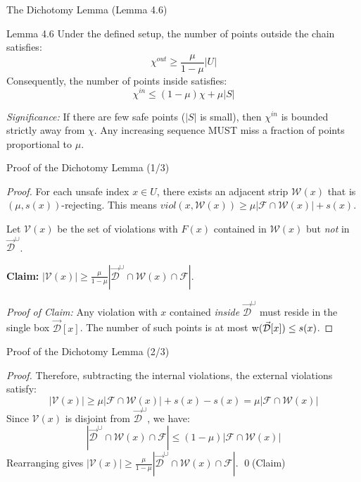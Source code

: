 \documentclass[11pt,aspectratio=169]{beamer}
\newcommand{\width}{{\bf {\rm  w}}}
\begin{document}
\begin{frame}{The Dichotomy Lemma (Lemma 4.6)}
    \begin{block}{Lemma 4.6}
        Under the defined setup, the number of points outside the chain satisfies:
        $$\chi^{out} \geq \frac{\mu}{1-\mu} |U|$$
        Consequently, the number of points inside satisfies:
        $$\chi^{in} \leq (1-\mu)\chi + \mu |S|$$
    \end{block}
    \vspace{0.3cm}
    \textit{Significance:} If there are few safe points ($|S|$ is small), then $\chi^{in}$ is bounded strictly away from $\chi$. Any increasing sequence MUST miss a fraction of points proportional to $\mu$.
\end{frame}

\begin{frame}{Proof of the Dichotomy Lemma (1/3)}
    \begin{proof}
        For each unsafe index $x \in U$, there exists an adjacent strip $\mathcal{W}(x)$ that is $(\mu, s(x))$-rejecting. This means $viol(x, \mathcal{W}(x)) \geq \mu |\mathcal{F} \cap \mathcal{W}(x)| + s(x)$.
        
        Let $\mathcal{V}(x)$ be the set of violations with $F(x)$ contained in $\mathcal{W}(x)$ but \textit{not} in $\vec{\mathcal{D}}^\cup$.
        
        \textbf{Claim:} $|\mathcal{V}(x)| \geq \frac{\mu}{1-\mu} |\vec{\mathcal{D}}^\cup \cap \mathcal{W}(x) \cap \mathcal{F}|$.
        
        \textit{Proof of Claim:} Any violation with $x$ contained \textit{inside} $\vec{\mathcal{D}}^\cup$ must reside in the single box $\vec{\mathcal{D}}[x]$. The number of such points is at most $\width(\vec{\mathcal{D}}[x]) \leq s(x)$.
    \end{proof}
\end{frame}

\begin{frame}{Proof of the Dichotomy Lemma (2/3)}
    \begin{proof}
        Therefore, subtracting the internal violations, the external violations satisfy:
        $$|\mathcal{V}(x)| \geq \mu |\mathcal{F} \cap \mathcal{W}(x)| + s(x) - s(x) = \mu |\mathcal{F} \cap \mathcal{W}(x)|$$
        Since $\mathcal{V}(x)$ is disjoint from $\vec{\mathcal{D}}^\cup$, we have:
        $$|\vec{\mathcal{D}}^\cup \cap \mathcal{W}(x) \cap \mathcal{F}| \leq (1-\mu) |\mathcal{F} \cap \mathcal{W}(x)|$$
        Rearranging gives $|\mathcal{V}(x)| \geq \frac{\mu}{1-\mu} |\vec{\mathcal{D}}^\cup \cap \mathcal{W}(x) \cap \mathcal{F}|$. \qed (Claim)
    \end{proof}
\end{frame}
\end{document}
